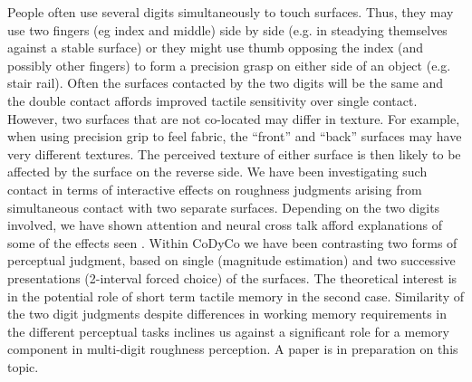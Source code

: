 People often use several digits simultaneously to touch surfaces. Thus, they may use two fingers (eg index and middle) side by side (e.g. in steadying themselves against a stable surface) or they might use thumb opposing the index (and possibly other fingers) to form a precision grasp on either side of an object (e.g. stair rail). Often the surfaces contacted by the two digits will be the same and the double contact affords improved tactile sensitivity over single contact. However, two surfaces that are not co-located may differ in texture. For example, when using precision grip to feel fabric, the “front” and “back” surfaces may have very different textures. The perceived texture of either surface is then likely to be affected by the surface on the reverse side. We have been investigating such contact in terms of interactive effects on roughness judgments arising from simultaneous contact with two separate surfaces. Depending on the two digits involved, we have shown attention and neural cross talk afford explanations of some of the effects seen \cite{roberts2010, roberts2013}. Within CoDyCo we have been contrasting two forms of perceptual judgment, based on single (magnitude estimation) and two successive presentations (2-interval forced choice) of the surfaces. The theoretical interest is in the potential role of short term tactile memory in the second case. Similarity of the two digit judgments despite differences in working memory requirements in the different perceptual tasks inclines us against a significant role for a memory component in multi-digit roughness perception. A paper is in preparation on this topic. 

